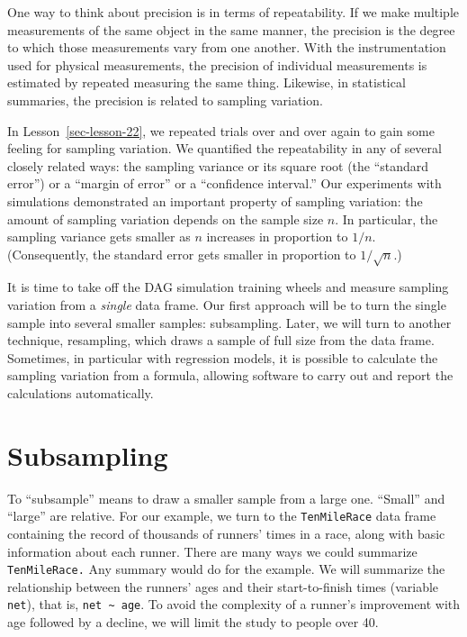 \documentclass[
  letterpaper,
  DIV=11,
  numbers=noendperiod,
  oneside]{scrreprt}
\begin{document}
One way to think about precision is in terms of repeatability. If we
make multiple measurements of the same object in the same manner, the
precision is the degree to which those measurements vary from one
another. With the instrumentation used for physical measurements, the
precision of individual measurements is estimated by repeated measuring
the same thing. Likewise, in statistical summaries, the precision is
related to sampling variation.

In Lesson~\ref{sec-lesson-22}, we repeated trials over and over again to
gain some feeling for sampling variation. We quantified the
repeatability in any of several closely related ways: the sampling
variance or its square root (the ``standard error'') or a ``margin of
error'' or a ``confidence interval.'' Our experiments with simulations
demonstrated an important property of sampling variation: the amount of
sampling variation depends on the sample size \(n\). In particular, the
sampling variance gets smaller as \(n\) increases in proportion to
\(1/n\). (Consequently, the standard error gets smaller in proportion to
\(1/\sqrt{n}\).)

It is time to take off the DAG simulation training wheels and measure
sampling variation from a \emph{single} data frame. Our first approach
will be to turn the single sample into several smaller samples:
subsampling. Later, we will turn to another technique, resampling, which
draws a sample of full size from the data frame. Sometimes, in
particular with regression models, it is possible to calculate the
sampling variation from a formula, allowing software to carry out and
report the calculations automatically.

\hypertarget{sec-subsampling}{%
\section{Subsampling}\label{sec-subsampling}}

To ``subsample'' means to draw a smaller sample from a large one.
``Small'' and ``large'' are relative. For our example, we turn to the
\texttt{TenMileRace} data frame containing the record of thousands of
runners' times in a race, along with basic information about each
runner. There are many ways we could summarize \texttt{TenMileRace.} Any
summary would do for the example. We will summarize the relationship
between the runners' ages and their start-to-finish times (variable
\texttt{net}), that is, \texttt{net\ \textasciitilde{}\ age}. To avoid
the complexity of a runner's improvement with age followed by a decline,
we will limit the study to people over 40.
\end{document}
